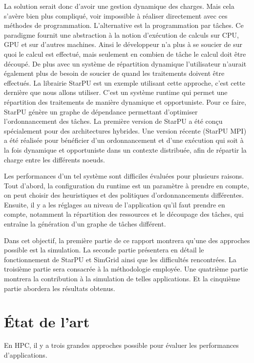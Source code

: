 \documentclass[smallextended]{svjour3}
\begin{document}
La solution serait donc d'avoir une gestion dynamique des
charges. Mais cela s'avère bien plus compliqué, voir impossible
à réaliser directement avec ces méthodes de
programmation. L'alternative est la programmation par tâches. Ce    
paradigme fournit une abstraction à la notion d'exécution de calculs sur CPU,
GPU et sur d'autres machines. Ainsi le développeur n'a plus à se
soucier de sur quoi le calcul est effectué, mais seulement en
combien de tâche le calcul doit être découpé. De plus avec un système de
répartition dynamique l'utilisateur n'aurait également plus de
besoin de soucier de quand les traitements doivent être effectués.
La librairie StarPU\cite{StarPU} est un exemple utilisant cette
approche, c'est cette dernière que nous allons utiliser. C'est un
système runtime qui permet une répartition des traitements de
manière dynamique et opportuniste. Pour ce faire, StarPU génère un
graphe de dépendance permettant d'optimiser l'ordonnancement des tâches. 
La première version de StarPU a été conçu spécialement pour des
architectures hybrides. Une version récente (StarPU MPI)\cite{StarPU-MPI} a été
réalisée pour bénéficier d'un ordonnancement et d'une exécution qui
soit à la fois dynamique et opportuniste dans un contexte distribuée,
afin de répartir la charge entre les différents noeuds.

Les performances d'un tel système sont difficiles évaluées pour
plusieurs raisons. Tout d'abord, la configuration du runtime
est un paramètre à prendre en compte, on peut choisir des
heuristiques et des politiques d'ordonnancements différentes.
Ensuite, il y a les réglages au niveau de l'application qu'il faut
prendre en compte, notamment la répartition des ressources et le
découpage des tâches, qui entraîne la génération d'un graphe de
tâches différent.

Dans cet objectif, la première partie de ce rapport montrera qu'une
des approches possible est la simulation. La seconde partie
présentera en détail le fonctionnement de StarPU et SimGrid 
ainsi que les difficultés rencontrées. La troisième partie sera
consacrée à la méthodologie employée.  Une quatrième partie montrera la
contribution à la simulation de telles applications.  Et la
cinquième partie abordera les résultats obtenus. 

\section{État de l'art}
\label{sec-2}
En HPC, il y a trois grandes approches possible pour évaluer les
performances d'applications.
\end{document}
